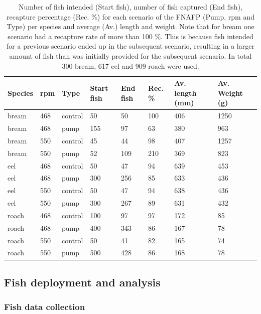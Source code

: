 \documentclass[fleqn,10pt]{wlscirep}
\begin{document}
\begin{table}[]
\centering
\caption{Number of fish intended (Start fish), number of fish captured (End fish), recapture percentage (Rec. \%) for each scenario of the FNAFP (Pump, rpm and Type) per species and average (Av.) length and weight. Note that for bream one scenario had a recapture rate of more than 100 \%. This is because fish intended for a previous scenario ended up in the subsequent scenario, resulting in a larger amount of fish than was initially provided for the subsequent scenario. In total 300 bream, 617 eel and 909 roach were used.}
\begin{tabular}{@{}llllllll@{}}
\toprule
Species & rpm & Type & Start fish & End fish & Rec. \% & Av. length (mm)& Av. Weight (g)\\ \midrule
bream   & 468 & control & 50                   & 50  & 100 & 406 & 1250\\
bream   & 468 & pump    & 155                  & 97  & 63 & 380 & 963\\
bream   & 550 & control & 45                   & 44  & 98 & 407 & 1257\\
bream   & 550 & pump    & 52                   & 109 & 210 & 369 & 823\\
eel     & 468 & control & 50                   & 47  & 94 & 639 & 453\\
eel     & 468 & pump    & 300                  & 256 & 85 & 633 & 436\\
eel     & 550 & control & 50                   & 47  & 94 & 638 & 436\\
eel     & 550 & pump    & 300                  & 267 & 89 & 631 & 432\\
roach   & 468 & control & 100                  & 97  & 97 & 172 & 85\\
roach   & 468 & pump    & 400                  & 343 & 86 & 167 & 78\\
roach   & 550 & control & 50                   & 41  & 82 & 165 & 74\\
roach   & 550 & pump    & 500                  & 428 & 86 & 168 & 78\\ \bottomrule
\end{tabular}
\label{tab:Capture_rate}
\end{table}

\subsection*{Fish deployment and analysis}

\subsubsection*{Fish data collection}
\end{document}
